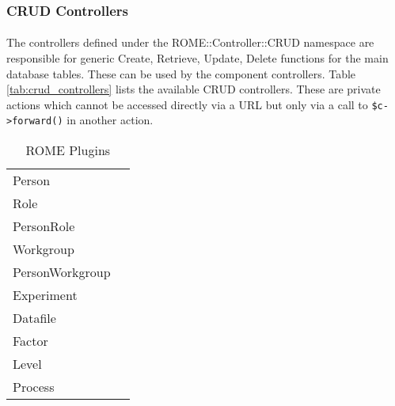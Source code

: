 \subsubsection{CRUD Controllers}
\label{sec:crud_controllers}

\paragraph{}
The controllers defined under the ROME::Controller::CRUD namespace are responsible for generic Create, Retrieve, Update, Delete functions for the main database tables. These can be used by the component controllers. Table \ref{tab:crud_controllers} lists the available CRUD controllers. These are private actions which cannot be accessed directly via a URL but only via a call to \texttt{\$c->forward()} in another action.



\begin{table}
\caption{ROME Plugins}
\label{tab:plugins}
\begin{footnotesize}
\begin{tabular}{ll}
Person\\
Role\\
PersonRole\\
Workgroup\\
PersonWorkgroup\\
Experiment\\
Datafile\\
Factor\\
Level\\
Process\\
\end{tabular}
\end{footnotesize}
\end{table}